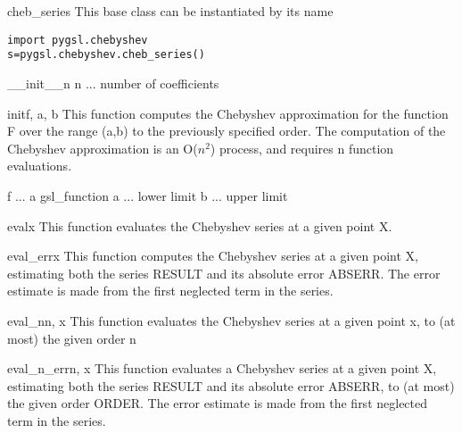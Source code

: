 \chapter[\protect\module{pygsl.chebyshev}]
{\protect{}}
\label{cha:statistics-module}


\begin{classdesc}{cheb_series}{}
  This base class can be instantiated by its name
\end{classdesc}
\begin{verbatim}
import pygsl.chebyshev
s=pygsl.chebyshev.cheb_series()
\end{verbatim}

\begin{methoddesc}{__init__}{n}
            n ... number of coefficients        
\end{methoddesc}
\begin{methoddesc}{init}{f, a, b}
        This function computes the Chebyshev approximation for the
        function F over the range (a,b) to the previously specified order.
        The computation of the Chebyshev approximation is an O($n^2$)
        process, and requires n function evaluations.

            f ... a gsl_function
            a ... lower limit
            b ... upper limit
        
\end{methoddesc}
\begin{methoddesc}{eval}{x}
        This function evaluates the Chebyshev series at a given point X.
\end{methoddesc}
\begin{methoddesc}{eval_err}{x}
         This function computes the Chebyshev series  at a given point X,
         estimating both the series RESULT and its absolute error ABSERR.
         The error estimate is made from the first neglected term in the
         series.
\end{methoddesc}
\begin{methoddesc}{eval_n}{n, x}
         This function evaluates the Chebyshev series at a given point
         x, to (at most) the given order n
\end{methoddesc}
\begin{methoddesc}{eval_n_err}{n, x}
        This function evaluates a Chebyshev series at a given point X,
        estimating both the series RESULT and its absolute error ABSERR,
        to (at most) the given order ORDER.  The error estimate is made
        from the first neglected term in the series.
\end{methoddesc}

